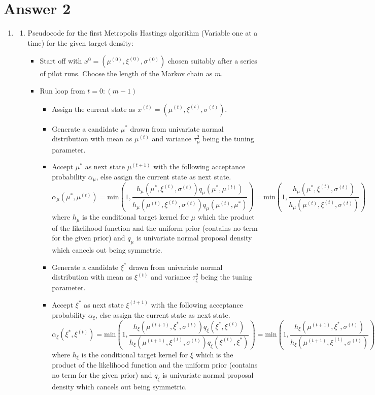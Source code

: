 \documentclass[12pt]{article}
\begin{document}
\section*{Answer 2}
\begin{enumerate}[label=(\alph*)]
\item 
\begin{enumerate}[label=(\roman*)]
\item
Pseudocode for the first Metropolis Hastings algorithm (Variable one at a time) for the given target density:
\begin{itemize}
\item Start off with $x^{0}=(\mu^{(0)},\xi^{(0)},\sigma^{(0)})$ chosen suitably after a series of pilot runs. Choose the length of the Markov chain as $m$.
\item Run loop from $t=0:(m-1)$
\begin{itemize}
\item Assign the current state as $x^{(t)}=(\mu^{(t)},\xi^{(t)},\sigma^{(t)})$.
\item Generate a candidate $\mu^{*}$ drawn from univariate normal distribution with mean as $\mu^{(t)}$ and variance $\tau_{\mu}^2$ being the tuning parameter.
\item Accept $\mu^{*}$ as next state $\mu^{(t+1)}$ with the following acceptance probability $\alpha_\mu$, else assign the current state as next state.
\[\alpha_\mu(\mu^{*},\mu^{(t)})=\text{min}\left(1,\dfrac{h_{\mu}(\mu^{*},\xi^{(t)},\sigma^{(t)})q_\mu(\mu^{*},\mu^{(t)})}{h_\mu(\mu^{(t)},\xi^{(t)},\sigma^{(t)})q_\mu(\mu^{(t)},\mu^{*})}\right)=\text{min}\left(1,\dfrac{h_\mu(\mu^{*},\xi^{(t)},\sigma^{(t)})}{h_\mu(\mu^{(t)},\xi^{(t)},\sigma^{(t)})}\right)\]
where $h_\mu$ is the conditional target kernel for $\mu$ which the product of the likelihood function and the uniform prior (contains no term for the given prior) and $q_\mu$ is univariate normal proposal density which cancels out being symmetric.

\item Generate a candidate $\xi^{*}$ drawn from univariate normal distribution with mean as $\xi^{(t)}$ and variance $\tau_{\xi}^2$ being the tuning parameter.
\item Accept $\xi^{*}$ as next state $\xi^{(t+1)}$ with the following acceptance probability $\alpha_\xi$, else assign the current state as next state.
\[\alpha_\xi(\xi^{*},\xi^{(t)})=\text{min}\left(1,\dfrac{h_\xi(\mu^{(t+1)},\xi^{*},\sigma^{(t)})q_\xi(\xi^{*},\xi^{(t)})}{h_\xi(\mu^{(t+1)},\xi^{(t)},\sigma^{(t)})q_\xi(\xi^{(t)},\xi^{*})}\right)=\text{min}\left(1,\dfrac{h_\xi(\mu^{(t+1)},\xi^{*},\sigma^{(t)})}{h_\xi(\mu^{(t+1)},\xi^{(t)},\sigma^{(t)})}\right)\]
where $h_\xi$ is the conditional target kernel for $\xi$ which is the product of the likelihood function and the uniform prior (contains no term for the given prior) and $q_\xi$ is univariate normal proposal density which cancels out being symmetric.


\end{itemize}
\end{itemize}
\end{enumerate}
\end{enumerate}
\end{document}
